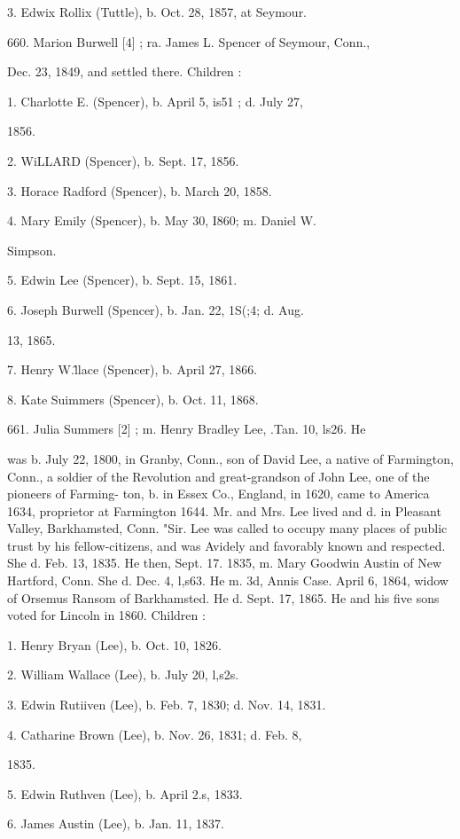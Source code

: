 \documentclass{book}
\begin{document}
3. Edwix Rollix (Tuttle), b. Oct. 28, 1857, at Seymour. 

660. Marion Burwell [4] ; ra. James L. Spencer of Seymour, Conn., 

Dec. 23, 1849, and settled there. Children : 

1. Charlotte E. (Spencer), b. April 5, is51 ; d. July 27, 

1856. 

2. WiLLARD (Spencer), b. Sept. 17, 1856. 

3. Horace Radford (Spencer), b. March 20, 1858. 

4. Mary Emily (Spencer), b. May 30, I860; m. Daniel W. 

Simpson. 

5. Edwin Lee (Spencer), b. Sept. 15, 1861. 

6. Joseph Burwell (Spencer), b. Jan. 22, 1S(;4; d. Aug. 

13, 1865. 

7. Henry W.\^llace (Spencer), b. April 27, 1866. 

8. Kate Suimmers (Spencer), b. Oct. 11, 1868. 

661. Julia Summers [2] ; m. Henry Bradley Lee, .Tan. 10, ls26. He 

was b. July 22, 1800, in Granby, Conn., son of David Lee, a 
native of Farmington, Conn., a soldier of the Revolution and 
great-grandson of John Lee, one of the pioneers of Farming- 
ton, b. in Essex Co., England, in 1620, came to America 1634, 
proprietor at Farmington 1644. Mr. and Mrs. Lee lived and 
d. in Pleasant Valley, Barkhamsted, Conn. "Sir. Lee was called 
to occupy many places of public trust by his fellow-citizens, 
and was Avidely and favorably known and respected. She d. 
Feb. 13, 1835. He then, Sept. 17. 1835, m. Mary Goodwin 
Austin of New Hartford, Conn. She d. Dec. 4, l,s63. He m. 
3d, Annis Case. April 6, 1864, widow of Orsemus Ransom of 
Barkhamsted. He d. Sept. 17, 1865. He and his five sons 
voted for Lincoln in 1860. Children : 

1. Henry Bryan (Lee), b. Oct. 10, 1826. 

2. William Wallace (Lee), b. July 20, l,s2s. 

3. Edwin Rutiiven (Lee), b. Feb. 7, 1830; d. Nov. 14, 1831. 

4. Catharine Brown (Lee), b. Nov. 26, 1831; d. Feb. 8, 

1835. 

5. Edwin Ruthven (Lee), b. April 2.s, 1833. 

6. James Austin (Lee), b. Jan. 11, 1837. 
\end{document}
